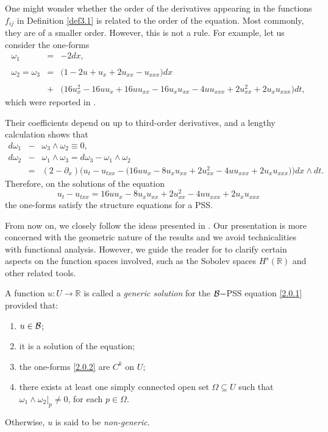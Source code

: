 \documentclass{cimart}
\newcommand{\ba}{\begin{array}}
\newcommand{\ea}{\end{array}}
\begin{document}
\begin{remark}
One might wonder whether the order of the derivatives appearing in the functions $f_{ij}$ in Definition \ref{def3.1} is related to the order of the equation. Most commonly, they are of a smaller order. However, this is not a rule. For example, let us consider the one-forms
$$
\ba{lcl}
\omega_1&=&-2dx,\\
\\
\omega_2=\omega_3&=&{\Big(1-2u+u_x+2u_{xx}-u_{xxx}\Big)dx}\\
\\
&+&{\Big(16u_x^2-16uu_x+16uu_{xx}-16u_xu_{xx}-4uu_{xxx}+2u_{xx}^2+2u_xu_{xxx}\Big)dt},
\ea
$$
which were reported in \cite[Theorem 2.1]{raspa-jde}.

Their coefficients depend on up to third-order derivatives, and a lengthy calculation shows that
$$
\ba{lcl}
  d\omega_1&-&\omega_3\wedge\omega_2\equiv0,\\
    d\omega_2&-&\omega_1\wedge\omega_3=d\omega_3-\omega_1\wedge\omega_2\\
    &=&(2-\partial_x)\Big(u_t-u_{txx}-\big(16uu_x-8u_xu_{xx}+2u_{xx}^2-4uu_{xxx}+2u_xu_{xxx}\big)\Big)dx\wedge dt.
\ea
$$
Therefore, on the solutions of the equation
$$u_t-u_{txx}=16uu_x-8u_xu_{xx}+2u_{xx}^2-4uu_{xxx}+2u_xu_{xxx}$$
the one-forms satisfy the structure equations for a PSS.
\end{remark}

From now on, we closely follow the ideas presented in \cite{freire-ch}. Our presentation is more concerned with the geometric nature of the results and we avoid technicalities with functional analysis. However, we guide the reader for \cite{freire-ch} to clarify certain aspects on the function spaces involved, such as the Sobolev spaces $H^s(\mathbb{R})$ and other related tools.


\begin{definition}\label{def3.2}
A function $u:U\rightarrow\mathbb{R}$ is called a \textit{generic solution} for the ${\cal B}-$PSS equation \eqref{2.0.1} provided that:
\begin{enumerate}
\item $u\in{\cal B}$;
\item it is a solution of the equation;
\item the one-forms \eqref{2.0.2} are $C^k$ on $U$;
\item there exists at least one simply connected open set $\Omega\subseteq U$ such that $\omega_1\wedge\omega_2\big|_{p}\neq0$, for each $p\in\Omega$.
\end{enumerate}
Otherwise, $u$ is said to be \textit{non-generic}.
\end{definition}
\end{document}
